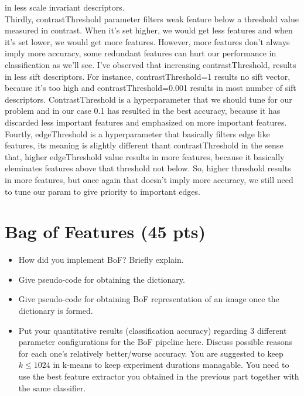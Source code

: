 \documentclass[12pt]{article}
\begin{document}
\begin{center}
        in less scale invariant descriptors.
        \\
        Thirdly, contrastThreshold parameter filters weak feature below a threshold value measured in contrast.
        When it's set higher, we would get less features and when it's set lower, we would get more features.
        However, more features don't always imply more accuracy, some redundant features can hurt our performance in classification as we'll see.
        I've observed that increasing contrastThreshold, results in less sift descriptors. For instance, contrastThreshold=1 results no sift vector, because it's too high and contrastThreshold=0.001 results in most number of sift descriptors.
        ContrastThreshold is a hyperparameter that we should tune for our problem and in our case 0.1 has resulted in the best accuracy, because it has discarded less important features and emphasized on more important features.
        \\
        Fourtly, edgeThreshold is a hyperparameter that basically filters edge like features, its meaning is slightly different thant contrastThreshold in the sense that, higher edgeThreshold value results in more features, because it basically eleminates features above that threshold not below.
        So, higher threshold results in more features, but once again that doesn't imply more accuracy, we still need to tune our param to give priority to important edges.


    \end{center}

\section{Bag of Features (45 pts)}
    \begin{itemize}
        \item How did you implement BoF? Briefly explain.
        \item Give pseudo-code for obtaining the dictionary.
        \item Give pseudo-code for obtaining BoF representation of an image once the dictionary is formed. 
        \item Put your quantitative results (classification accuracy) regarding 3 different parameter configurations for the BoF pipeline here. Discuss possible reasons for each one's relatively better/worse accuracy. You are suggested to keep $k \leq 1024$ in k-means to keep experiment durations managable. You need to use the best feature extractor you obtained in the previous part together with the same classifier.
    \end{itemize}
\end{document}
